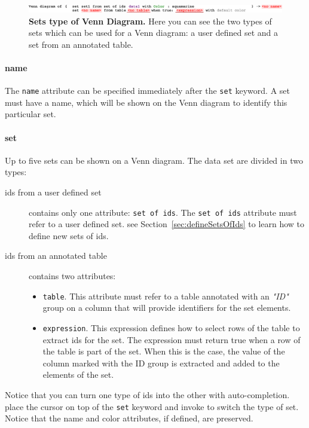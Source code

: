 \begin{figure}[h!tbp]
  \centering
  \includegraphics[width=\figWidthWide]{figures/SetsVennDiagram.pdf}
\caption[Sets type of venn diagram.]{\textbf{Sets type of Venn Diagram.} Here you can see  the two types of sets which can be used for a Venn diagram: a user defined set and a set from an annotated table.}
\label{fig:SetsVennDiagram}
\end{figure}

\paragraph{name}
The \texttt{name} attribute can be specified immediately after the \texttt{set} keyword. A set must have a name, which will be shown on the Venn diagram to identify this particular set.

\paragraph{set}
Up to five sets can be shown on a Venn diagram. The data set are divided in two types:
\begin{description}
\item[ids from a user defined set] contains only one attribute: \texttt{set of ids}. The \texttt{set of ids} attribute must refer to a user defined set. see Section~\ref{sec:defineSetsOfIds} to learn how to define new sets of ids.

\item[ids from an annotated table]  contains two attributes:
\begin{itemize}
\item \texttt{table}. This attribute must refer to a table annotated with an \textit{"ID"} group on a column that will provide identifiers for the set elements. 
\item \texttt{expression}. This expression defines how to select rows of the table to extract ids for the set. The expression must return true when a row of the table is part of the set. When this is the case, the value of the column marked with the ID group is extracted and added to the elements of the set.
\end{itemize}
\end{description}

\begin{remark}
Notice that you can turn one type of ids into the other with auto-completion. place the cursor on top of the \texttt{set} keyword and invoke  to switch the type of set.  Notice that the name and color attributes, if defined, are preserved.
\end{remark}


